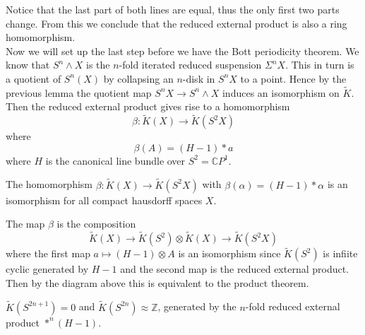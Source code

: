 \documentclass[../Thesis.tex]{subfiles}
\begin{document}
\begin{center}
\end{center}
Notice that the last part of both lines are equal, thus the only first two parts change. From this we conclude that the reduced external product is also a ring homomorphism.
\\Now we will set up the last step before we have the Bott periodicity theorem. We know that $S^n \wedge X$ is the $n$-fold iterated reduced suspension $\Sigma^n X$. This in turn is a quotient of $S^n(X)$ by collapsing an $n$-disk in $S^nX$ to a point. Hence by the previous lemma the quotient map $S^nX \rightarrow S^n \wedge X$ induces an isomorphism on $\tilde{K}$.
\\Then the reduced external product gives rise to a homomorphism 
\begin{equation}
\beta: \tilde{K}(X) \rightarrow \tilde{K}(S^2 X)
\end{equation} where 
\begin{equation}
\beta(A) = (H - 1) * a
\end{equation}
where $H$ is the canonical line bundle over $S^2 = \mathbb{C}P^1$. 
\begin{theorem}
The homomorphism $\beta : \tilde{K}(X) \rightarrow \tilde{K}(S^2X)$ with $\beta(\alpha) = (H-1) * \alpha$ is an isomorphism for all compact hausdorff spaces $X$.
\end{theorem}
\begin{myproof}
The map $\beta$ is the composition 
\begin{equation}\tilde{K}(X) \rightarrow \tilde{K}(S^2)\otimes \tilde{K}(X) \rightarrow \tilde{K}(S^2X)
\end{equation}
where the first map $a \mapsto (H-1) \otimes A$ is an isomorphism since $\tilde{K}(S^2)$ is infiite cyclic generated by $H-1$ and the second map is the reduced external product. Then by the diagram above this is equivalent to the product theorem.
\end{myproof}
\begin{Cor}
$\tilde{K}(S^{2n+1}) = 0$ and $\tilde{K}(S^{2n}) \approx \mathbb{Z}$, generated by the $n$-fold reduced external product $*^n(H-1)$.
\end{Cor} 
\end{document}
